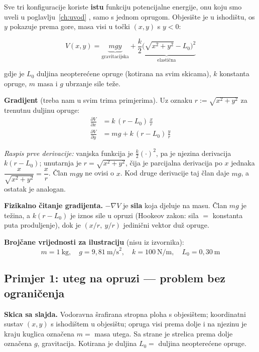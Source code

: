 Sve tri konfiguracije koriste \textbf{istu} funkciju potencijalne energije,
onu koju smo uveli u poglavlju~\ref{ch:uvod} , samo s jednom oprugom.
Objesište je u ishodištu, os $y$ pokazuje prema gore, masa visi u točki
$(x,y)$ s $y < 0$:

\begin{equation}
\label{eq:V-opruga}
V(x,y) = \underbrace{mgy}_{\text{gravitacijska}}
       + \underbrace{\frac{k}{2}\Big(\sqrt{x^2+y^2} - L_0\Big)^2}_{\text{elastična}}
\end{equation}

gdje je $L_0$ duljina neopterećene opruge (kotirana na svim skicama), $k$
konstanta opruge, $m$ masa i $g$ ubrzanje sile teže.

\textbf{Gradijent} (treba nam u svim trima primjerima). Uz oznaku
$r := \sqrt{x^2+y^2}$ za trenutnu duljinu opruge:
\begin{align}
\frac{\partial V}{\partial x}
  &= k\,(r - L_0)\,\frac{x}{r} \label{eq:dVdx}\\
\frac{\partial V}{\partial y}
  &= mg + k\,(r - L_0)\,\frac{y}{r} \label{eq:dVdy}
\end{align}

\emph{Raspis prve derivacije:} vanjska funkcija je $\tfrac{k}{2}(\cdot)^2$, pa
je njezina derivacija $k(r - L_0)$; unutarnja je $r = \sqrt{x^2+y^2}$, čija je
parcijalna derivacija po $x$ jednaka $\dfrac{x}{\sqrt{x^2+y^2}} = \dfrac{x}{r}$.
Član $mgy$ ne ovisi o $x$. \checkmark \; Kod druge derivacije taj član daje
$mg$, a ostatak je analogan.

\textbf{Fizikalno čitanje gradijenta.} $-\nabla V$ je \textbf{sila} koja
djeluje na masu. Član $mg$ je težina, a $k(r-L_0)$ je iznos sile u opruzi
(Hookeov zakon: sila $=$ konstanta puta produljenje), dok je $(x/r,\ y/r)$
jedinični vektor duž opruge.

\textbf{Brojčane vrijednosti za ilustraciju} (nisu iz izvornika):
\[
m = 1\ \text{kg}, \quad g = 9{,}81\ \text{m/s}^2, \quad
k = 100\ \text{N/m}, \quad L_0 = 0{,}30\ \text{m}
\]

\subsection{Primjer 1: uteg na opruzi --- problem bez ograničenja}

\textbf{Skica sa slajda.} Vodoravna šrafirana stropna ploha s objesištem;
koordinatni sustav $(x,y)$ s ishodištem u objesištu; opruga visi prema dolje i
na njezinu je kraju kuglica označena $m = $ masa utega. Sa strane je strelica
prema dolje označena $g$, gravitacija. Kotirana je duljina $L_0 = $ duljina
neopterećene opruge.

